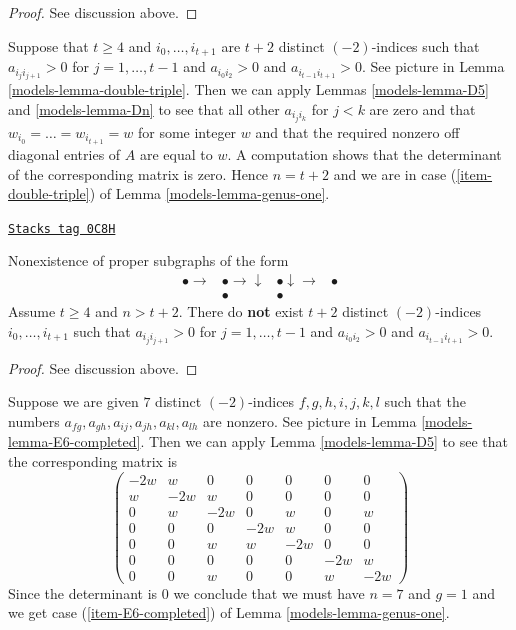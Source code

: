 \begin{proof}
See discussion above.
\end{proof}

Suppose that $t \geq 4$ and $i_0, \ldots, i_{t + 1}$ are
$t + 2$ distinct $(-2)$-indices such that
$a_{i_ji_{j + 1}} > 0$ for $j = 1, \ldots, t - 1$
and $a_{i_0i_2} > 0$ and $a_{i_{t - 1}i_{t + 1}} > 0$.
See picture in Lemma \ref{models-lemma-double-triple}.
Then we can apply Lemmas \ref{models-lemma-D5} and \ref{models-lemma-Dn}
to see that all other $a_{i_ji_k}$ for $j < k$ are zero
and that $w_{i_0} = \ldots = w_{i_{t + 1}} = w$ for some
integer $w$ and that the required nonzero off diagonal
entries of $A$ are equal to $w$.
A computation shows that the determinant of the
corresponding matrix is zero. Hence $n = t + 2$
and we are in case (\ref{item-double-triple}) of
Lemma \ref{models-lemma-genus-one}.

\begin{lemma}
\label{models-lemma-double-triple}
\href{https://stacks.math.columbia.edu/tag/0C8H}{\texttt{Stacks tag 0C8H}}

Nonexistence of proper subgraphs of the form
$$
\begin{array}{cccc}\bullet \longrightarrow & \bullet \longrightarrow\downarrow & \bullet \downarrow\longrightarrow & \bullet \\  & \bullet & \bullet & \end{array}
$$
Assume $t \geq 4$ and $n > t + 2$.
There do {\bf not} exist $t + 2$ distinct
$(-2)$-indices $i_0, \ldots, i_{t + 1}$ such that
$a_{i_ji_{j + 1}} > 0$ for $j = 1, \ldots, t - 1$
and $a_{i_0i_2} > 0$ and $a_{i_{t - 1}i_{t + 1}} > 0$.
\end{lemma}

\begin{proof}
See discussion above.
\end{proof}

Suppose we are given $7$ distinct $(-2)$-indices $f, g, h, i, j, k, l$
such that the numbers
$a_{fg}, a_{gh}, a_{ij}, a_{jh}, a_{kl}, a_{lh}$ are nonzero.
See picture in Lemma \ref{models-lemma-E6-completed}. Then we can apply
Lemma \ref{models-lemma-D5} to see that the corresponding matrix is
$$
\left(
\begin{matrix}
-2w & w & 0 & 0 & 0 & 0 & 0 \\
w & -2w & w & 0 & 0 & 0 & 0 \\
0 & w & -2w & 0 & w & 0 & w \\
0 & 0 & 0 & -2w & w & 0 & 0 \\
0 & 0 & w & w & -2w & 0 & 0 \\
0 & 0 & 0 & 0 & 0 & -2w & w \\
0 & 0 & w & 0 & 0 & w & -2w
\end{matrix}
\right)
$$
Since the determinant is $0$ we conclude that we must have $n = 7$
and $g = 1$ and we get case (\ref{item-E6-completed})
of Lemma \ref{models-lemma-genus-one}.

